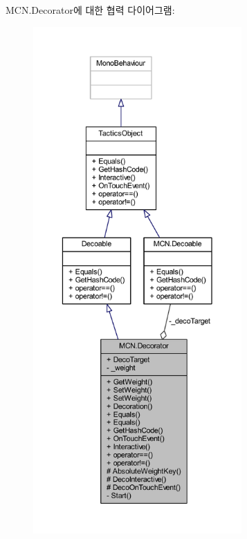 M\+C\+N.\+Decorator에 대한 협력 다이어그램\+:
\nopagebreak
\begin{figure}[H]
\begin{center}
\leavevmode
\includegraphics[height=550pt]{class_m_c_n_1_1_decorator__coll__graph}
\end{center}
\end{figure}

